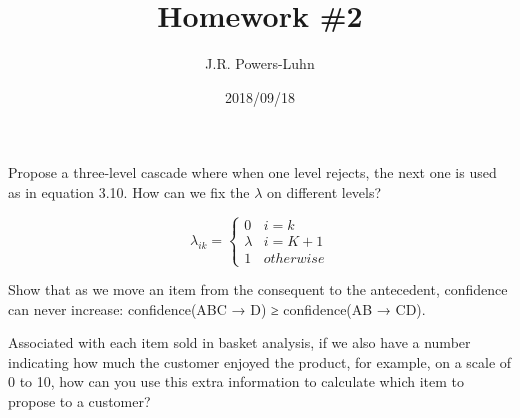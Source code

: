 \documentclass{hw}
\author{J.R. Powers-Luhn}
\date{2018/09/18}
\title{Homework \#2}
\begin{document}

    Propose a three-level cascade where when one level rejects, the next one is used as in equation 3.10. How can we fix the $\lambda$ on different levels? 

    \begin{equation}
        \lambda_{ik} =
        \begin{cases}
        0 & i = k \\
        \lambda & i = K + 1 \\
        1 & otherwise

    \end{cases}
    \end{equation}

\solution
    

    Show that as we move an item from the consequent to the antecedent, confidence can never increase: confidence(ABC → D) ≥ confidence(AB → CD).

\solution
    

    Associated with each item sold in basket analysis, if we also have a number indicating how much the customer enjoyed the product, for example, on a scale of 0 to 10, how can you use this extra information to calculate which item to propose to a customer?

\solution
    
\end{document}
